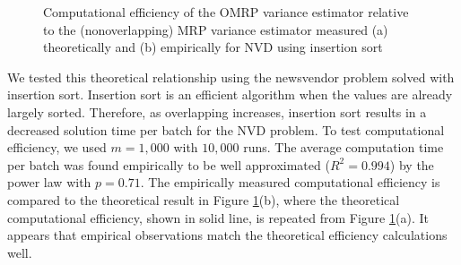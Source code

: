 \documentclass[12pt]{article}
\begin{document}
\begin{figure}[thb!]
	\centering
		\caption{
		Computational efficiency of the OMRP variance estimator relative to the (nonoverlapping) MRP variance estimator measured
		(a) theoretically and
		(b) empirically for NVD using insertion sort
		}
\label{fig:efficiency}
\end{figure}


We tested this theoretical relationship using the newsvendor problem solved with insertion sort.
Insertion sort is an efficient algorithm when the values are already largely sorted. 
Therefore, as overlapping increases, insertion sort results in a decreased solution time per batch for the NVD problem. 
To test computational efficiency, we used $m = 1,000$ with $10,000$ runs.
The average computation time per batch was found empirically to be well approximated ($R^2 = 0.994$) by the power law with $p = 0.71$.
The empirically measured computational efficiency is compared to the theoretical result in Figure \ref{fig:efficiency}(b), where the theoretical computational efficiency, shown in solid line, is repeated from Figure \ref{fig:efficiency}(a).
It appears that empirical observations match the theoretical efficiency calculations well. 
\end{document}
